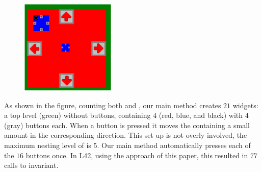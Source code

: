 \begin{figure}
    \centering\includegraphics[width=0.4\textwidth]{GuiImg}\end{figure}
 As shown in the figure, counting both \Q@SafeMovable@s and \Q@Button@s, our main method creates $21$ widgets: a top level (green) \Q@SafeMovable@ without buttons, containing $4$ (red, blue, and black) \Q@SafeMovable@s with
$4$ (gray) buttons each. When a button is pressed it moves the containing \Q@SafeMovable@ a small amount in the corresponding direction.
This set up is not overly involved, the maximum nesting level of \Q@Widget@s is $5$.
Our main method automatically presses each of the $16$ buttons once. In L42, using the approach of this paper, this resulted in $77$ calls to \Q@SafeMovable@s invariant.

